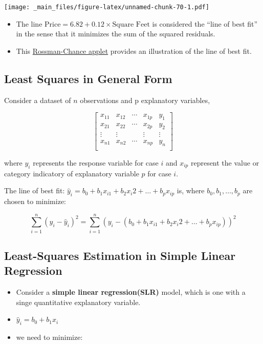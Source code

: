\documentclass[]{book}
\begin{document}
\texttt{[image: \_main\_files/figure-latex/unnamed-chunk-70-1.pdf]}

\begin{itemize}
\item
  The line \(\text{Price} = 6.82 + 0.12 \times \text{Square Feet}\) is
  considered the ``line of best fit'' in the sense that it minimizes the
  sum of the squared residuals.
\item
  This
  \href{http://www.rossmanchance.com/applets/RegShuffle.htm}{Rossman-Chance
  applet} provides an illustration of the line of best fit.
\end{itemize}

\subsection{Least Squares in General
Form}\label{least-squares-in-general-form}

Consider a dataset of \(n\) observations and p explanatory variables,

\[
\begin{bmatrix}
x_{11}    & x_{12}    & \cdots & x_{1p}  & y_1\\
x_{21}    & x_{22}    & \cdots & x_{2p} & y_2\\
\vdots    & \vdots    &  & \vdots  & \vdots\\
x_{n1}    & x_{n2}    & \cdots & x_{np} & y_n\\
\end{bmatrix}
\]

where \(y_i\) represents the response variable for case \(i\) and
\(x_{ip}\) represent the value or category indicatory of explanatory
variable \(p\) for case \(i\).

The line of best fit:
\(\hat{y}_i = b_0 + b_1x_{i1} + b_2{x_i2} + \ldots + b_px_{ip}\) is,
where \(b_0, b_1, \ldots, b_p\) are chosen to minimize:

\[ \displaystyle\sum_{i=1}^n (y_i -\hat{y}_i)^2  = \displaystyle\sum_{i=1}^n (y_i - (b_0 + b_1x_{i1} + b_2{x_i2} + \ldots + b_px_{ip}))^2 \]

\subsection{Least-Squares Estimation in Simple Linear
Regression}\label{least-squares-estimation-in-simple-linear-regression}

\begin{itemize}
\item
  Consider a \textbf{simple linear regression(SLR)} model, which is one
  with a singe quantitative explanatory variable.
\item
  \(\hat{y}_i = b_0+b_1x_i\)
\item
  we need to minimize:
\end{itemize}
\end{document}
